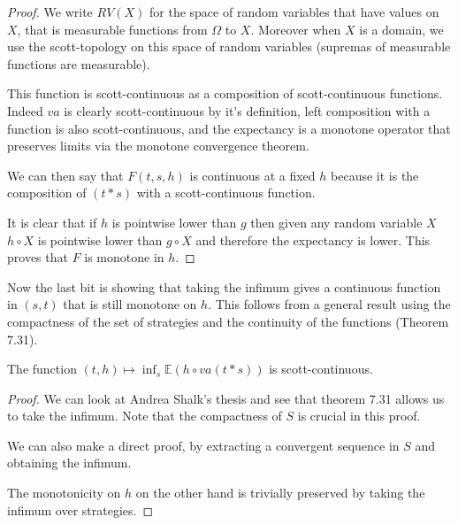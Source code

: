 \begin{ensps}
\begin{proof}
    We write $RV(X)$ for the space of random variables 
    that have values on $X$, that is measurable 
    functions from $\Omega$ to $X$. Moreover when 
    $X$ is a domain, we use the scott-topology on this 
    space of random variables (supremas of measurable functions 
    are measurable).

    \begin{center}
    \end{center}

    This function is scott-continuous as a composition of 
    scott-continuous functions. Indeed $va$ is clearly scott-continuous 
    by it's definition, left composition with a function is also
    scott-continuous, and the expectancy is a monotone operator 
    that preserves limits via the monotone convergence theorem. 

    We can then say that $F(t,s,h)$ is continuous at a fixed $h$
    because it is the composition of $(t*s)$ with a scott-continuous 
    function.

    It is clear that if $h$ is pointwise lower than $g$
    then given any random variable $X$ $h \circ X$ is pointwise 
    lower than $g \circ X$ and therefore the expectancy 
    is lower. This proves that $F$ is monotone in $h$.
\end{proof}
\end{ensps}

Now the last bit is showing that taking the infimum gives 
a continuous function in $(s,t)$ that is still monotone on $h$.
This follows from a general result using the compactness of the 
set of strategies and the continuity of the functions 
\cite{AndreaShalk} (Theorem 7.31).

\begin{ensps}
\begin{alemma}
    The function $(t,h) \mapsto \inf_s \mathbb{E} (h \circ va(t*s))$
    is scott-continuous.
\end{alemma}

\begin{proof}
    We can look at Andrea Shalk's thesis 
    \cite{AndreaShalk} and see that theorem 7.31 
    allows us to take the infimum. Note that 
    the compactness of $S$ is crucial in this proof.

    We can also make a direct proof, by extracting 
    a convergent sequence in $S$ and obtaining the 
    infimum. 


    The monotonicity on $h$ on the other hand is 
    trivially preserved by taking the infimum over
    strategies. 
\end{proof}
\end{ensps}


